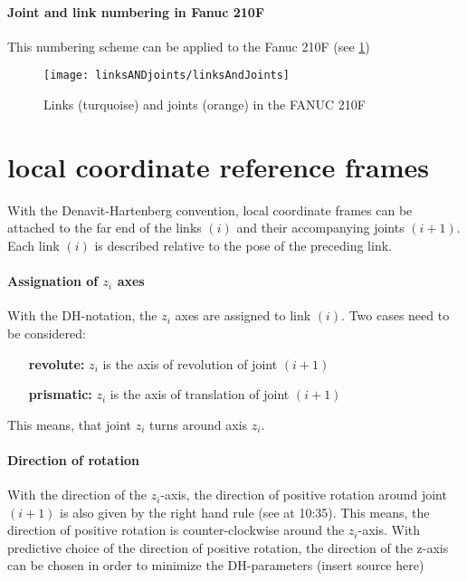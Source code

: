 \paragraph{Joint and link numbering in Fanuc 210F}

This numbering scheme can be applied to the Fanuc 210F (see \ref{fig:LinksANDJoints210F}) 


\begin{figure}[H]
	\texttt{[image: linksANDjoints/linksAndJoints]}
	\caption{Links (turquoise) and joints (orange) in the FANUC 210F}
	\label{fig:LinksANDJoints210F}
\end{figure}



\section{local coordinate reference frames}
With the Denavit-Hartenberg convention, local coordinate frames can be attached to the far end of the links $ (i) $ and their accompanying joints $ (i+1) $.
Each link $(i)$ is described relative to the pose of the preceding link.



\paragraph{Assignation of $z_i$ axes}

With the DH-notation, the $z_i$ axes are assigned to link $(i)$.
Two cases need to be considered: %
\begin{itemize}[wide=\parindent]
	\item[\textbf{revolute:}] $z_i$ is the axis of revolution of joint $(i+1)$
	\item[\textbf{prismatic:}] $z_i$ is the axis of translation of joint $(i+1)$
\end{itemize}
This means, that joint $z_i$ turns around axis $z_i$.

\paragraph{Direction of rotation}
With the direction of the $z_i$-axis, the direction of positive rotation around joint $(i+1)$ is also given by the right hand rule (see \cite{Angela_U1S2P1} at 10:35). This means, the direction of positive rotation is counter-clockwise around the $z_i$-axis.
With predictive choice of the direction of positive rotation, the direction of the z-axis can be chosen in order to minimize the DH-parameters (insert source here)

